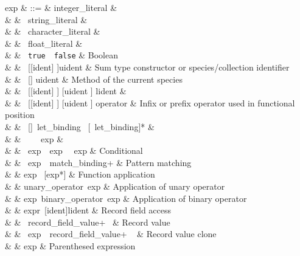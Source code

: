 \vspace{0.2cm}
\begin{syntax}
exp & ::= & integer\_literal & \\
    &     & \mid\ string\_literal & \\
    &     & \mid\ character\_literal & \\
    &     & \mid\ float\_literal & \\
    &     & \mid\ {\tt true}\ \mid\ {\tt false} & Boolean \\
    &     & \mid\ [[ident] \terminal{\#}]uident & Sum type constructor
                                       or species/collection identifier \\
    &     & \mid\ [] \terminal{!} uident &
                       Method of the current species \\
    &     & \mid\ [[ident] \terminal{\#}] [uident \terminal{!}] lident & \\
    &     & \mid\ [[ident] \terminal{\#}] [uident \terminal{!}]
               \terminal{(} operator \terminal{)} & Infix or prefix
            operator used in functional position \\
    &     & \mid {}\ []\ let\_binding
               \ [\ let\_binding]* & \\
    &     & \ \ \ \ exp & \\
    &     & \mid {}\ exp\ \ exp
                 \ \ exp & Conditional \\
    &     & \mid {}\ exp\ \ match\_binding+ &
                     Pattern matching \\
    &     & \mid exp\ \terminal{(} [exp*] \terminal{)} & Function application \\
    &     & \mid unary\_operator\ exp & Application of unary operator \\
    &     & \mid exp\ binary\_operator\ exp & Application of binary operator \\
    &     & \mid expr\ [ident\terminal{\#}]lident &
                 Record field access \\
    &     & \mid \terminal{\{}\ record\_field\_value+\ \terminal{\}} &
                                                               Record value \\
    &     & \mid \terminal{\{}\ exp\ \ record\_field\_value+
                  \ \terminal{\}} & Record value clone \\
    &     & \mid \terminal{(} exp \terminal{)} & Parenthesed expression
\end{syntax}

